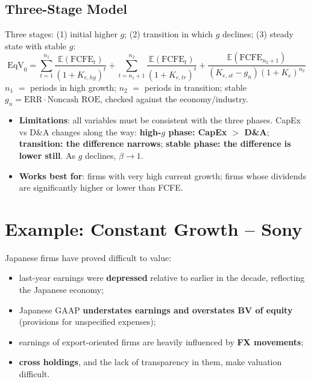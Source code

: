 \subsection{Three-Stage Model}
\begin{keybox}
Three stages: (1) initial higher $g$; (2) transition in which $g$ declines; (3) steady state with stable $g$:
\[
\text{EqV}_0=\sum_{t=1}^{n_1}\frac{\mathbb{E}(\text{FCFE}_t)}{(1+K_{e,hg})^t}+\sum_{t=n_1+1}^{n_2}\frac{\mathbb{E}(\text{FCFE}_t)}{(1+K_{e,tr})^t}+\frac{\mathbb{E}(\text{FCFE}_{n_2+1})}{(K_{e,st}-g_n)(1+K_e)^{n_2}}
\]
$n_1$ $=$ periods in high growth; $n_2$ $=$ periods in transition; stable $g_n=\text{ERR}\cdot\text{Noncash ROE}$, checked against the economy/industry.
\end{keybox}
\begin{itemize}
  \item \textbf{Limitations}: all variables must be consistent with the three phases. CapEx vs D\&A changes along the way: \textbf{high-$g$ phase: CapEx $>$ D\&A}; \textbf{transition: the difference narrows}; \textbf{stable phase: the difference is lower still}. As $g$ declines, $\beta\to1$.
  \item \textbf{Works best for}: firms with very high current growth; firms whose dividends are significantly higher or lower than FCFE.
\end{itemize}

\section{Example: Constant Growth -- Sony}

Japanese firms have proved difficult to value:
\begin{itemize}
  \item last-year earnings were \textbf{depressed} relative to earlier in the decade, reflecting the Japanese economy;
  \item Japanese GAAP \textbf{understates earnings and overstates BV of equity} (provisions for unspecified expenses);
  \item earnings of export-oriented firms are heavily influenced by \textbf{FX movements};
  \item \textbf{cross holdings}, and the lack of transparency in them, make valuation difficult.
\end{itemize}

